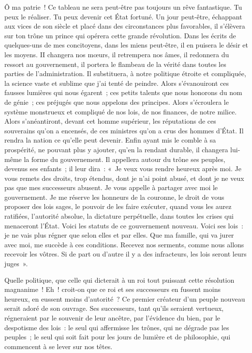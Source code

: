 \documentclass[french,twoside]{book} %
\begin{document}
Ô ma patrie ! Ce tableau ne sera peut-être pas toujours un rêve fantastique. Tu peux le réaliser. Tu peux devenir cet État fortuné. Un jour peut-être, échappant aux vices de son siècle et placé dans des circonstances plus favorables, il s’élèvera sur ton trône un prince qui opérera cette grande révolution. Dans les écrits de quelques-uns de mes concitoyens, dans les miens peut-être, il en puisera le désir et les moyens. II changera nos mœurs, il retrempera nos âmes, il redonnera du ressort au gouvernement, il portera le flambeau de la vérité dans toutes les parties de l’administration. Il substituera, à notre politique étroite et compliquée, la science vaste et sublime que j’ai tenté de peindre. Alors s’évanouiront ces fausses lumières qui nous égarent ; ces petits talents que nous honorons du nom de génie ; ces préjugés que nous appelons des principes. Alors s’écroulera le système monstrueux et compliqué de nos lois, de nos finances, de notre milice. Alors s’anéantiront, devant cet homme supérieur, les réputations de ces souverains qu’on a encensés, de ces ministres qu’on a crus des hommes d’État. Il rendra la nation ce qu’elle peut devenir. Enfin ayant mis le comble à sa prospérité, ne pouvant plus y ajouter, qu’en la rendant durable, il changera lui-même la forme du gouvernement. Il appellera autour du trône ses peuples, devenus ses enfants ; il leur dira : « Je veux vous rendre heureux après moi. Je vous remets des droits, trop étendus, dont je n’ai point abusé, et dont je ne veux pas que mes successeurs abusent. Je vous appelle à partager avec moi le gouvernement. Je me réserve les honneurs de la couronne, le droit de vous proposer des lois sages, le pouvoir de les faire exécuter, quand vous les aurez ratifiées, l’autorité absolue, la dictature perpétuelle, dans toutes les crises qui menaceront l’État. Voici les statuts de ce gouvernement nouveau. Voici ses lois : je ne vais plus régner que selon elles et par elles. Que ma famille, qui va jurer avec moi, me succède à ces conditions. Recevez nos serments, comme nous allons recevoir les vôtres. Si de part ou d’autre il y a des infracteurs, les lois seront leurs juges ».\par
Quelle politique, que celle qui dicterait à un roi tout puissant cette résolution magnanime ! Eh ! croit-on que ce roi et ses successeurs en fussent moins heureux, en eussent moins d’autorité ? Ce premier créateur d’un peuple nouveau serait adoré de son ouvrage. Ses successeurs, tant qu’ils seraient vertueux, régneraient par le souvenir de leur ancêtre, par l’évidence du bien, par le despotisme des lois : le seul qui affermisse les trônes, qui ne dégrade pas les peuples ; le seul qui soit fait pour les jours de lumière et de philosophie, qui commencent à se lever sur nos têtes.
\end{document}
